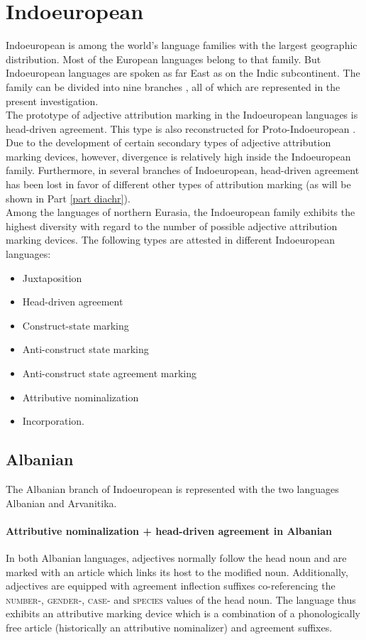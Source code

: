 \section{Indoeuropean}
Indoeuropean is among the world's language families with the largest geographic distribution. Most of the European languages belong to that family. But Indoeuropean languages are spoken as far East as on the Indic subcontinent. The family can be divided into nine branches \cite[218]{salminen2007}, all of which are represented in the present investigation.\\

\noindent The prototype of adjective attribution marking in the Indoeuropean languages is head-driven agreement. This type is also reconstructed for Proto-Indoeuropean \citep{decsy1991,watkins1998}. Due to the development of certain secondary types of adjective attribution marking devices, however, divergence is relatively high inside the Indoeuropean family. Furthermore, in several branches of Indoeuropean, head-driven agreement has been lost in favor of different other types of attribution marking (as will be shown in Part \ref{part diachr}).\\

\noindent Among the languages of northern Eurasia, the Indoeuropean family exhibits the highest diversity with regard to the number of possible adjective attribution marking devices. The following types are attested in different Indoeuropean languages:
\begin{itemize}
\item Juxtaposition
\item Head-driven agreement
\item Construct-state marking
\item Anti-construct state marking
\item Anti-construct state agreement marking
\item Attributive nominalization
\item Incorporation.
\end{itemize}

\subsection{Albanian} \label{albanian synchr}
The Albanian branch of Indoeuropean is represented with the two languages Albanian and Arvanitika.

\paragraph{Attributive nominalization + head-driven agreement in Albanian}
In both Albanian languages, adjectives normally follow the head noun and are marked with an article which links its host to the modified noun. Additionally, adjectives are equipped with agreement inflection suffixes co-referencing the \textsc{number}-, \textsc{gender}-, \textsc{case}- and \textsc{species} values of the head noun. The language thus exhibits an attributive marking device which is a combination of a phonologically free article (historically an attributive nominalizer) and agreement suffixes.

